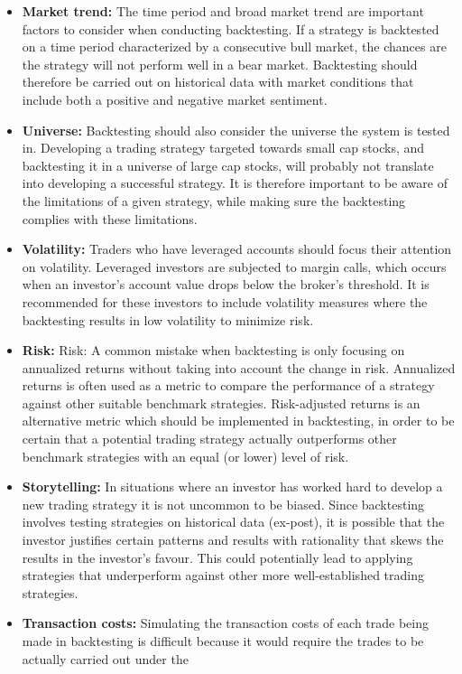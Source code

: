 \begin{itemize}
\item \textbf{Market trend:} The time period and broad market trend are important factors to consider when conducting backtesting. If a strategy is backtested on a time period characterized by a consecutive bull market, the chances are the strategy will not perform well in a bear market. Backtesting should therefore be carried out on historical data with market conditions that include both a positive and negative market sentiment. 
\item \textbf{Universe:} Backtesting should also consider the universe the system is tested in. Developing a trading strategy targeted towards small cap stocks, and backtesting it in a universe of large cap stocks, will probably not translate into developing a successful strategy. It is therefore important to be aware of the limitations of a given strategy, while making sure the backtesting complies with these limitations.
\item \textbf{Volatility:} Traders who have leveraged accounts should focus their attention on volatility. Leveraged investors are subjected to margin calls, which occurs when an investor’s account value drops below the broker’s threshold. It is recommended for these investors to include volatility measures where the backtesting results in low volatility to minimize risk.   
\item \textbf{Risk:} Risk: A common mistake when backtesting is only focusing on annualized returns without taking into account the change in risk. Annualized returns is often used as a metric to compare the performance of a strategy against other suitable benchmark strategies. Risk-adjusted returns is an alternative metric which should be implemented in backtesting, in order to be certain that a potential trading strategy actually outperforms other benchmark strategies with an equal (or lower) level of risk.     
\item \textbf{Storytelling:} In situations where an investor has worked hard to develop a new trading strategy it is not uncommon to be biased. Since backtesting involves testing strategies on historical data (ex-post), it is possible that the investor justifies certain patterns and results with rationality that skews the results in the investor’s favour. This could potentially lead to applying strategies that underperform against other more well-established trading strategies. 
\item \textbf{Transaction costs:}  Simulating the transaction costs of each trade being made in backtesting is difficult because it would require the trades to be actually carried out under the       

\end{itemize}
